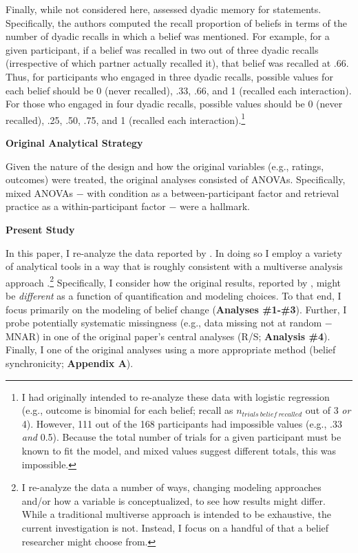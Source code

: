 \documentclass[12pt]{article}  %
\begin{document}
Finally, while not considered here, \textcite{vlasceanu_synchronization_2020} assessed dyadic memory for statements. Specifically, the authors computed the recall proportion of beliefs in terms of the number of dyadic recalls in which a belief was mentioned. For example, for a given participant, if a belief was recalled in two out of three dyadic recalls (irrespective of which partner actually recalled it), that belief was recalled at .66. Thus, for participants who engaged in three dyadic recalls, possible values for each belief should be 0 (never recalled), .33, .66, and 1 (recalled each interaction). For those who engaged in four dyadic recalls, possible values should be 0 (never recalled), .25, .50, .75, and 1 (recalled each interaction).\footnote{I had originally intended to re-analyze these data with logistic regression (e.g., outcome is binomial for each belief; recall as $n_{trials\:belief\:recalled}$ out of 3 \textit{or} 4). However, 111 out of the 168 participants had impossible values (e.g., .33 \textit{and} 0.5). Because the total number of trials for a given participant must be known to fit the model, and mixed values suggest different totals, this was impossible.}

\noindent\textbf{Original Analytical Strategy}

Given the nature of the design and how the original variables (e.g., ratings, outcomes) were treated, the original analyses consisted of ANOVAs. Specifically, mixed ANOVAs $-$ with condition as a between-participant factor and retrieval practice as a within-participant factor $-$ were a hallmark.


\begin{center}
    \textbf{Present Study} %
\end{center}

In this paper, I re-analyze the data reported by \textcite{vlasceanu_synchronization_2020}. In doing so I employ a variety of analytical tools in a way that is roughly consistent with a multiverse analysis approach \parencite{steegen_increasing_2016}.\footnote{I re-analyze the data a number of ways, changing modeling approaches and/or how a variable is conceptualized, to see how results might differ. While a traditional multiverse approach is intended to be exhaustive, the current investigation is not. Instead, I focus on a handful of  that a belief researcher might choose from.} Specifically, I consider how the original results, reported by \textcite{vlasceanu_synchronization_2020}, might be \textit{different} as a function of quantification and modeling choices. To that end, I focus primarily on the modeling of belief change (\textbf{Analyses \#1-\#3}). Further, I probe potentially systematic missingness (e.g., data missing not at random $-$ MNAR) in one of the original paper's central analyses (R/S; \textbf{Analysis \#4}). Finally, I  one of the original analyses using a more appropriate method (belief synchronicity; \textbf{Appendix A}).
\end{document}
